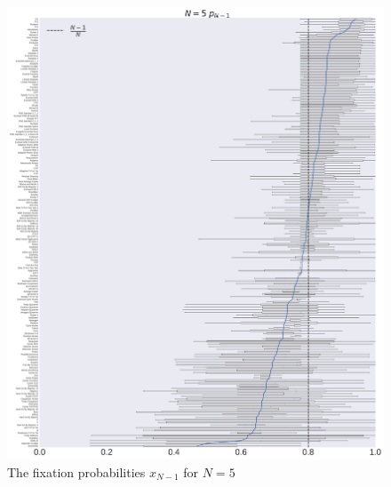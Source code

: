 \documentclass[10pt,letterpaper]{article}
\begin{document}
\begin{figure}[!hbtp]
    \centering
    \includegraphics[width=\textwidth]{./boxplot_5_resist.pdf}
    \caption{The fixation probabilities \(x_{N-1}\) for \(N=5\)}
\end{figure}
\end{document}
